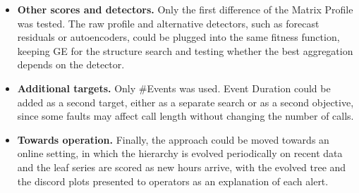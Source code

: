 \begin{itemize}
    \item \textbf{Other scores and detectors.}
    Only the first difference of the Matrix Profile was tested.
    The raw profile and alternative detectors, such as forecast residuals or autoencoders, could be plugged into the same fitness function, keeping \ac{GE} for the structure search and testing whether the best aggregation depends on the detector.

    \item \textbf{Additional targets.}
    Only \#Events was used.
    Event Duration could be added as a second target, either as a separate search or as a second objective, since some faults may affect call length without changing the number of calls.

    \item \textbf{Towards operation.}
    Finally, the approach could be moved towards an online setting, in which the hierarchy is evolved periodically on recent data and the leaf series are scored as new hours arrive, with the evolved tree and the discord plots presented to operators as an explanation of each alert.
\end{itemize}
